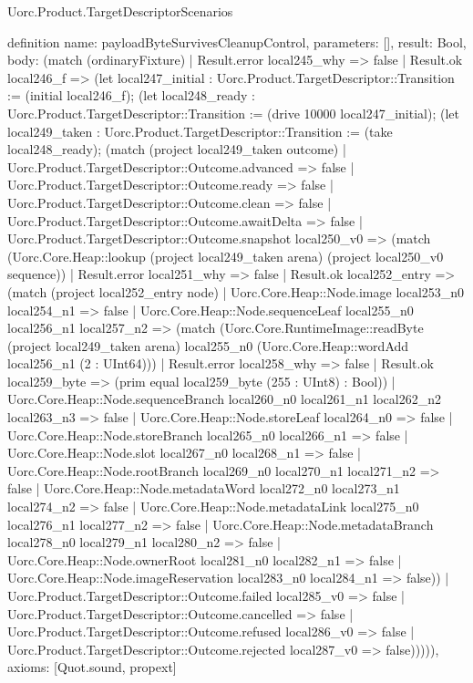 \begin{lexlean}{Uorc.Product.TargetDescriptorScenarios}
\begin{semanticmodule}
definition{
  name: payloadByteSurvivesCleanupControl,
  parameters: [],
  result: Bool,
  body: (match (ordinaryFixture)
    | Result.error local245_why => false
    | Result.ok local246_f => (let local247_initial : Uorc.Product.TargetDescriptor::Transition := (initial local246_f); (let local248_ready : Uorc.Product.TargetDescriptor::Transition := (drive 10000 local247_initial); (let local249_taken : Uorc.Product.TargetDescriptor::Transition := (take local248_ready); (match (project local249_taken outcome)
      | Uorc.Product.TargetDescriptor::Outcome.advanced => false
      | Uorc.Product.TargetDescriptor::Outcome.ready => false
      | Uorc.Product.TargetDescriptor::Outcome.clean => false
      | Uorc.Product.TargetDescriptor::Outcome.awaitDelta => false
      | Uorc.Product.TargetDescriptor::Outcome.snapshot local250_v0 => (match (Uorc.Core.Heap::lookup (project local249_taken arena) (project local250_v0 sequence))
        | Result.error local251_why => false
        | Result.ok local252_entry => (match (project local252_entry node)
          | Uorc.Core.Heap::Node.image local253_n0 local254_n1 => false
          | Uorc.Core.Heap::Node.sequenceLeaf local255_n0 local256_n1 local257_n2 => (match (Uorc.Core.RuntimeImage::readByte (project local249_taken arena) local255_n0 (Uorc.Core.Heap::wordAdd local256_n1 (2 : UInt64)))
            | Result.error local258_why => false
            | Result.ok local259_byte => (prim equal local259_byte (255 : UInt8) : Bool))
          | Uorc.Core.Heap::Node.sequenceBranch local260_n0 local261_n1 local262_n2 local263_n3 => false
          | Uorc.Core.Heap::Node.storeLeaf local264_n0 => false
          | Uorc.Core.Heap::Node.storeBranch local265_n0 local266_n1 => false
          | Uorc.Core.Heap::Node.slot local267_n0 local268_n1 => false
          | Uorc.Core.Heap::Node.rootBranch local269_n0 local270_n1 local271_n2 => false
          | Uorc.Core.Heap::Node.metadataWord local272_n0 local273_n1 local274_n2 => false
          | Uorc.Core.Heap::Node.metadataLink local275_n0 local276_n1 local277_n2 => false
          | Uorc.Core.Heap::Node.metadataBranch local278_n0 local279_n1 local280_n2 => false
          | Uorc.Core.Heap::Node.ownerRoot local281_n0 local282_n1 => false
          | Uorc.Core.Heap::Node.imageReservation local283_n0 local284_n1 => false))
      | Uorc.Product.TargetDescriptor::Outcome.failed local285_v0 => false
      | Uorc.Product.TargetDescriptor::Outcome.cancelled => false
      | Uorc.Product.TargetDescriptor::Outcome.refused local286_v0 => false
      | Uorc.Product.TargetDescriptor::Outcome.rejected local287_v0 => false))))),
  axioms: [Quot.sound, propext]
}


\end{semanticmodule}
\end{lexlean}
